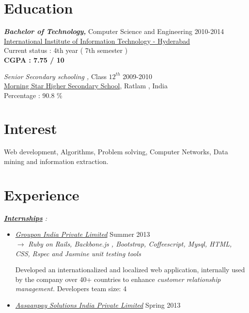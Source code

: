 \documentclass[margin]{res}
\begin{document}
\begin{resume}
 
\section{Education} {\sl \bf Bachelor of Technology,} Computer Science and Engineering    \hfill{2010-2014}\\
		  \hypersetup{urlcolor=black}          
          \href{http://www.iiit.ac.in/}{International Institute of Information Technology - Hyderabad} \\
		  \hypersetup{urlcolor=blue}
          Current status : 4th year ( 7th semester ) \\
          {\bf CGPA : 7.75 / 10}
                 
          {\sl Senior Secondary schooling ,} Class ${12}^{th}$   \hfill{2009-2010} \\
		  \hypersetup{urlcolor=black}          
          \href{http://www.morningstarratlam.com/home_morningstarschool.htm}{Morning Star Higher Secondary School}, Ratlam , India \\
          \hypersetup{urlcolor=blue}
          Percentage : 90.8 \% 


\section{Interest} { Web development, Algorithms, Problem solving, Computer Networks, Data mining and information extraction. }


\section{Experience}
{\sl \underline{\bf Internships} : }
\begin{itemize}
\item
 \hypersetup{urlcolor=black}
 {\it \href{http://www.linkedin.com/company/groupon-india}{Groupon India Private Limited}} \hfill{Summer 2013} \\
 \hypersetup{urlcolor=blue}
$\rightarrow$ {\it Ruby on Rails, Backbone.js , Bootstrap, Coffeescript, Mysql, HTML, CSS, Rspec and Jasmine unit testing tools } 

 Developed an internationalized and localized web application, internally used by the company over 40+ countries to enhance {\it customer relationship management.} \hfill{Developers team size: 4} 
\item
\hypersetup{urlcolor=black}
{\it \href{http://www.linkedin.com/company/3049433}{Aasaanpay Solutions India Private Limited}}  \hfill{Spring 2013} 


\end{itemize}
\end{resume}
\end{document}
